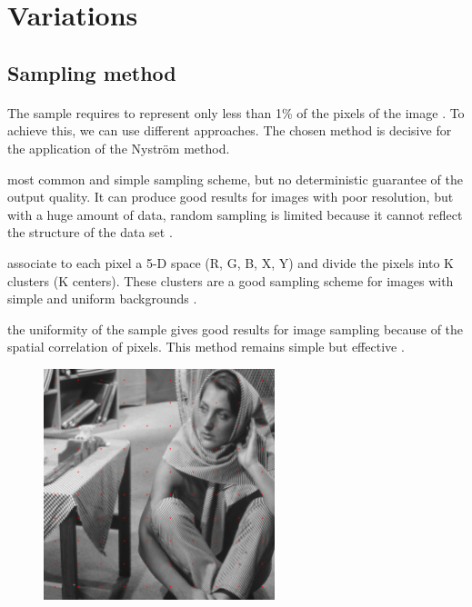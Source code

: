 \section{Variations}

\subsection{Sampling method}

\paragraph{}
The sample requires to represent only less than 1\% of the pixels of the image \cite{glide_2014}.
To achieve this, we can use different approaches. The chosen method is decisive for the application of the Nystr\"om method.
\begin{description}[align=left]
 \item [Random sampling (RS)] most common and simple sampling scheme, but no deterministic guarantee of the output quality. It can produce good results for images with poor resolution, but with a huge amount of data, random sampling is limited because it cannot reflect the structure of the data set \cite{zhan_improved_2017}.
 \item [K-means sampling (KS)] associate to each pixel a 5-D space (R, G, B, X, Y) and divide the pixels into K clusters (K centers). These clusters are a good sampling scheme for images with simple and uniform backgrounds \cite{kao_sampling_2012} \cite{zhang_improved_2008}.
 \item [Uniform spatially sampling] the uniformity of the sample gives good results for image sampling because of the spatial correlation of pixels. This method remains simple but effective \cite{glide_2014}.
  \begin{figure}[H]
      \centering
      \includegraphics[width=0.6\textwidth]{img/spatiallyUniformSampling.png}

\end{figure}
\end{description}
